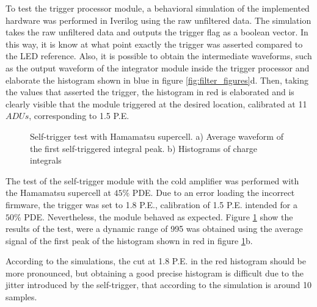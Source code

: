 To test the trigger processor module, a behavioral simulation of the implemented hardware was performed in Iverilog using the raw unfiltered data. The simulation takes the raw unfiltered data and outputs the trigger flag as a boolean vector. In this way, it is know at what point exactly the trigger was asserted compared to the LED reference. Also, it is possible to obtain the intermediate waveforms, such as the output waveform of the integrator module inside the trigger processor and elaborate the histogram shown in blue in figure \ref{fig:filter_figures}d. Then, taking the values that asserted the trigger, the histogram in red is elaborated and is clearly visible that the module triggered at the desired location, calibrated at 11 $ADUs$, corresponding to 1.5 P.E.  

\begin{figure}[h]
\centering
{}
\caption[]{Self-trigger test with Hamamatsu supercell. a) Average waveform of the first self-triggered integral peak. b) Histograms of charge integrals}
\label{fig:self_trigger_test}
\end{figure}

The test of the self-trigger module with the cold amplifier was performed with the Hamamatsu supercell at $45\%$ PDE. Due to an error loading the incorrect firmware, the trigger was set to 1.8 P.E., calibration of 1.5 P.E. intended for a $50\%$ PDE. Nevertheless, the module behaved as expected. Figure \ref{fig:self_trigger_test} show the results of the test, were a dynamic range of 995 was obtained using the average signal of the first peak of the histogram shown in red in figure \ref{fig:self_trigger_test}b.

According to the simulations, the cut at 1.8 P.E. in the red histogram should be more pronounced, but obtaining a good precise histogram is difficult due to the jitter introduced by the self-trigger, that according to the simulation is around 10 samples.

\label{sec:testing}